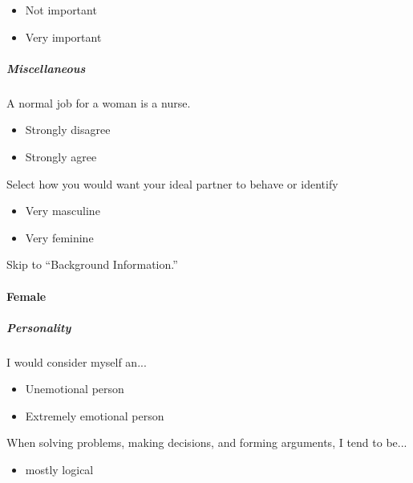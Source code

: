 \documentclass[twoside]{report}
\begin{document}
\begin{multicols}{2}
\begin{itemize}
\item
  Not important
\end{itemize}

\begin{itemize}
\item
  Very important
\end{itemize}

\subparagraph{Miscellaneous}

A normal job for a woman is a nurse.

\begin{itemize}
\item
  Strongly disagree
\end{itemize}

\begin{itemize}
\item
  Strongly agree
\end{itemize}

Select how you would want your ideal partner to behave or identify

\begin{itemize}
\item
  Very masculine
\end{itemize}

\begin{itemize}
\item
  Very feminine
\end{itemize}

Skip to ``Background Information.''

\paragraph{Female}

\subparagraph{Personality}

I would consider myself an...

\begin{itemize}
\item
  Unemotional person
\end{itemize}

\begin{itemize}
\item
  Extremely emotional person
\end{itemize}

When solving problems, making decisions, and forming arguments, I tend
to be...

\begin{itemize}
\item
  mostly logical
\end{itemize}


\end{multicols}
\end{document}
